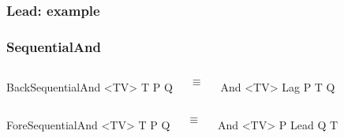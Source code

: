 \documentclass[aspectratio=169]{beamer}
\begin{document}
\begin{frame}
  \frametitle{Lead: example}
\end{frame}

\begin{frame}[fragile]
  \frametitle{SequentialAnd}

  \begin{columns}
    \column{1in}
\begin{semiverbatim}
BackSequentialAnd <TV>
  T
  P
  Q
\end{semiverbatim}

    \column{0.5in}
    $$\equiv$$

    \column{1in}
\begin{semiverbatim}
And <TV>
  Lag
    P
    T
  Q
\end{semiverbatim}

  \end{columns}

    \begin{columns}
    \column{1in}
\begin{semiverbatim}
ForeSequentialAnd <TV>
  T
  P
  Q
\end{semiverbatim}

    \column{0.5in}
    $$\equiv$$

    \column{1in}
\begin{semiverbatim}
And <TV>
  P
  Lead
    Q
    T
\end{semiverbatim}

  \end{columns}

\end{frame}
\end{document}
